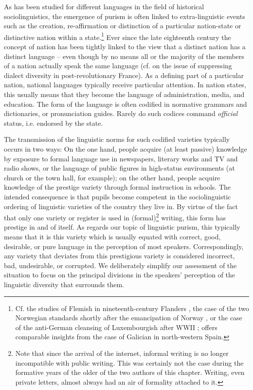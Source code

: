 \documentclass[output=paper]{langsci/langscibook}
\begin{document}
As has been studied for different languages in the field of historical sociolinguistics, the emergence of purism is often linked to extra-linguistic events such as the creation, re-affirmation or distinction of a particular nation-state or distinctive nation within a state.\footnote{Cf. the studies of Flemish in nineteenth-century Flanders \citep{VandenbusscheEtAl2005}, the case of the two Norwegian standards shortly after the emancipation of Norway \citep{Jahr2007}, or the case of the anti-German cleansing of Luxembourgish after WWII \citep{Horner2005}; \citet{DelValle2016} offers comparable insights from the case of Galician in north-western Spain.} Ever since the late eighteenth century the concept of nation has been tightly linked to the view that a distinct nation has a distinct language – even though by no means all or the majority of the members of a nation actually speak the same language (cf. \citealt{Weber1977} on the issue of suppressing dialect diversity in post-revolutionary France). As a defining part of a particular nation, national languages typically receive particular attention. In nation states, this usually means that they become the language of administration, media, and education. The form of the language is often codified in normative grammars and dictionaries, or pronunciation guides. Rarely do such codices command \textit{official} status, i.e. endorsed by the state.\par The transmission of the linguistic norms for such codified varieties typically occurs in two ways: On the one hand, people acquire (at least passive) knowledge by exposure to formal language use in newspapers, literary works and TV and radio shows, or the language of public figures in high-status environments (at church or the town hall, for example); on the other hand, people acquire knowledge of the prestige variety through formal instruction in schools. The intended consequence is that pupils become competent in the sociolinguistic ordering of linguistic varieties of the country they live in. By virtue of the fact that only one variety or register is used in (formal)\footnote{Note that since the arrival of the internet, informal writing is no longer incompatible with public writing. This was certainly not the case during the formative years of the older of the two authors of this chapter. Writing, even private letters, almost always had an air of formality attached to it.} writing, this form has prestige in and of itself. As regards our topic of linguistic purism, this typically means that it is this variety which is usually equated with correct, good, desirable, or pure language in the perception of most speakers. Correspondingly, any variety that deviates from this prestigious variety is considered incorrect, bad, undesirable, or corrupted. We deliberately simplify our assessment of the situation to focus on the principal divisions in the speakers’ perception of the linguistic diversity that surrounds them.
\end{document}
